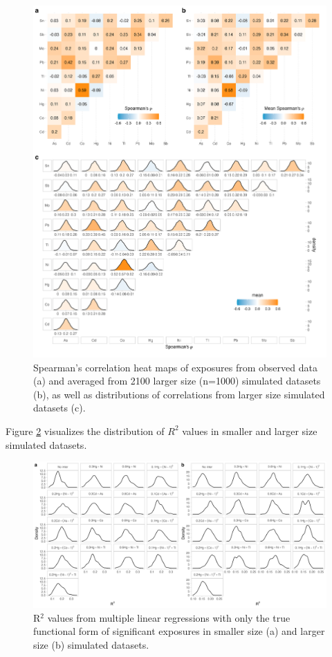\documentclass[12pt, twoside]{amherstthesis}
\begin{document}
\begin{figure}

{\centering \includegraphics[width=1\linewidth]{figures/ch4_corr_lg_simorigdens} 

}

\caption{Spearman's correlation heat maps of exposures from observed data (a) and averaged from 2100 larger size (n=1000) simulated datasets (b), as well as distributions of correlations from larger size simulated datasets (c).}\label{fig:corsimslg}
\end{figure}
Figure \ref{fig:rsqcheck} visualizes the distribution of \(R^2\) values in smaller and larger size simulated datasets.
\begin{figure}

{\centering \includegraphics[width=1\linewidth]{figures/chem_rsq} 

}

\caption{R$^2$ values from multiple linear regressions with only the true functional form of significant exposures in smaller size (a) and larger size (b) simulated datasets.}\label{fig:rsqcheck}
\end{figure}
\end{document}
